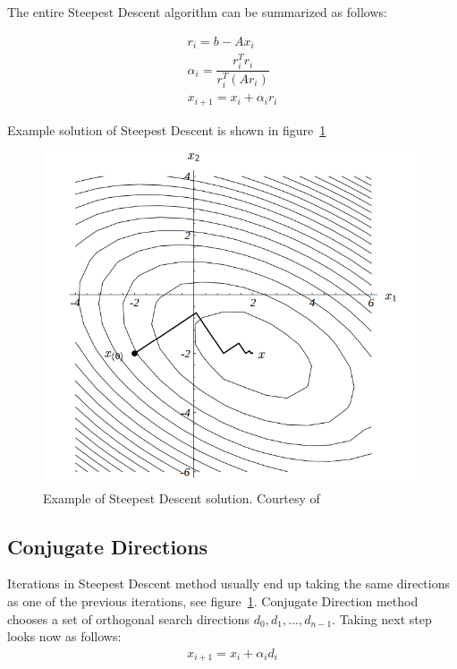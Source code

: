 \documentclass[en]{minipw} %
\begin{document}
The entire Steepest Descent algorithm can be summarized as follows:

\begin{equation}
\begin{aligned}
r_{i} = b - Ax_{i}
\\
\alpha_{i} = \dfrac{r_{i}^{T}r_{i}}{r_{i}^{T} (Ar_{i})}
\\
x_{i+1} = x_{i} + \alpha_{i}r_{i}
\end{aligned}
\end{equation}

Example solution of Steepest Descent is shown in figure~\ref{fig:steepest_descent}

\begin{figure}[h!]
\centering
\includegraphics[scale=0.5]{pictures/steepest_descent.png}
\caption[Steepest Descent steps]{Example of Steepest Descent solution. Courtesy of~\cite{cg}}
\label{fig:steepest_descent}
\end{figure}

\subsection{Conjugate Directions}
Iterations in Steepest Descent method usually end up taking the same directions as one of the previous iterations, see figure~\ref{fig:steepest_descent}. Conjugate Direction method chooses a set of orthogonal search directions $d_0, d_1,...,d_{n-1}$. Taking next step looks now as follows:
\begin{equation}
\begin{aligned}
x_{i+1} = x_{i} + \alpha_{i}d_{i}
\end{aligned}
\end{equation}
\end{document}

